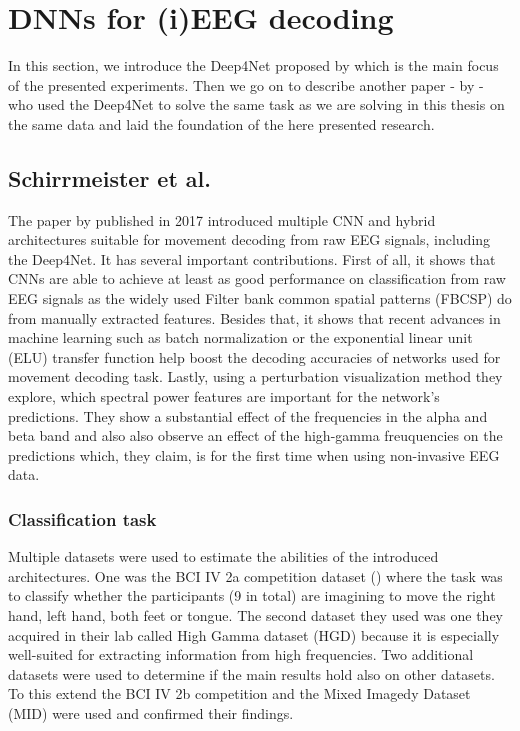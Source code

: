 \section{DNNs for (i)EEG decoding}
\label{sec:dnn-decoding}
In this section, we introduce the Deep4Net proposed by \cite{schirrmeister-deep-2017} which is the main focus of the presented experiments.
Then we go on to describe another paper - by \cite{Hammer-2021} - who used the Deep4Net to solve the same task as we are solving in this thesis on the same data and laid the foundation of the here presented research.

\subsection{Schirrmeister et al.}\label{subsec:schirrmeister-et-al}
The paper by \cite{schirrmeister-deep-2017} published in 2017 introduced multiple CNN and hybrid architectures suitable for movement decoding from raw EEG signals, including the Deep4Net.
It has several important contributions.
First of all, it shows that CNNs are able to achieve at least as good performance on classification from raw EEG signals as the widely used Filter bank common spatial patterns (FBCSP) do from manually extracted features. Besides that, it shows that recent advances in machine learning such as batch normalization or the exponential linear unit (ELU) transfer function help boost the decoding accuracies of networks used for movement decoding task.
Lastly, using a perturbation visualization method they explore, which spectral power features are important for the network's predictions.
They show a substantial effect of the frequencies in the alpha and beta band and also also observe an effect of the high-gamma freuquencies on the predictions which, they claim, is for the first time when using non-invasive EEG data.

\subsubsection{Classification task}
Multiple datasets were used to estimate the abilities of the introduced architectures.
One was the BCI IV 2a competition dataset (\cite{brunner2008bci}) where the task was to classify whether the participants (9 in total) are imagining to move the right hand, left hand, both feet or tongue.
The second dataset they used was one they acquired in their lab called High Gamma dataset (HGD) because it is especially well-suited for extracting information from high frequencies.
Two additional datasets were used to determine if the main results hold also on other datasets. 
To this extend the BCI IV 2b competition and the Mixed Imagedy Dataset (MID) were used and confirmed their findings.


